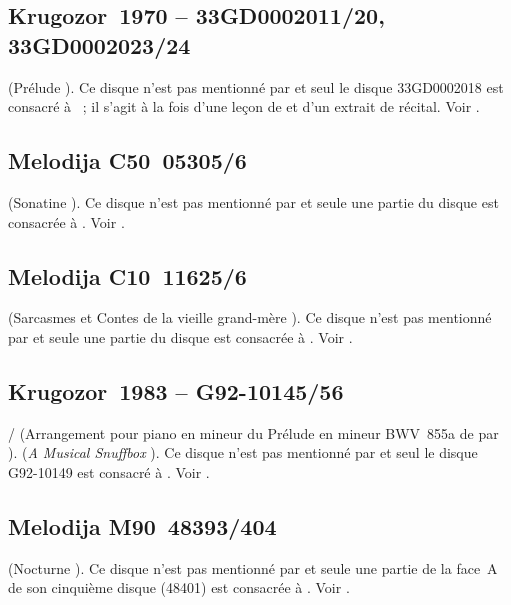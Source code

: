 \subsection{Krugozor~1970  -- 33GD0002011/20, 33GD0002023/24}

\Scriabine{} (Prélude  ).
Ce disque n'est pas mentionné par \INikonovich{}
\citep[voir][]{Nikonovich11} et seul le disque 33GD0002018 est consacré à
\VSofronitsky{}~; il s'agit à la fois d'une leçon de \VSofronitsky{} et d'un
extrait de récital.
Voir \citet{Recordssu}.

\subsection{Melodija C50~05305/6}

\Kabalevski{} (Sonatine  ).
Ce disque n'est pas mentionné par \INikonovich{}
\citep[voir][]{Nikonovich11} et seule une partie du disque est consacrée à
\VSofronitsky{}.
Voir \citet{Recordssu}.

\subsection{Melodija C10~11625/6}

\Prokofiev{} (Sarcasmes  et Contes de la vieille grand-mère
).
Ce disque n'est pas mentionné par \INikonovich{}
\citep[voir][]{Nikonovich11} et seule une partie du disque est consacrée à
\VSofronitsky{}.
Voir \citet{Recordssu}.

\subsection{Krugozor~1983  -- G92-10145/56}

\Bach{}/\Ziloti{} (Arrangement pour piano en \kB mineur du Prélude
 en \kE mineur BWV~855a de \Bach{} par \Ziloti{}).
\Liadov{} (\emph{A Musical Snuffbox} ).
Ce disque n'est pas mentionné par \INikonovich{}
\citep[voir][]{Nikonovich11} et seul le disque G92-10149 est consacré à
\VSofronitsky{}.
Voir \citet{Recordssu}.

\subsection{Melodija M90~48393/404}

\Chopin{} (Nocturne  ).
Ce disque n'est pas mentionné par \INikonovich{}
\citep[voir][]{Nikonovich11} et seule une partie de la face~A de son
cinquième disque (48401) est consacrée à \VSofronitsky{}.
Voir \citet{Recordssu}.

